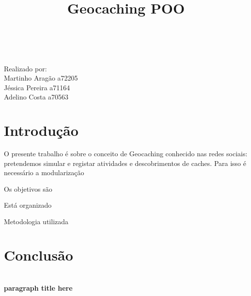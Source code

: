 \documentclass[a4paper,12pt]{article}
\title{Geocaching POO}
\begin{document}
\maketitle
\\
\\Realizado por:
\\Martinho Aragão a72205 
\\Jéssica Pereira a71164	
\\Adelino Costa a70563
\\


\tableofcontents

\section{Introdução}
O presente trabalho é sobre o conceito de Geocaching conhecido nas redes sociais: pretendemos simular e registar atividades e descobrimentos de caches. Para isso é necessário a modularização 

Os objetivos são

Está organizado 

Metodologia utilizada

\section{Conclusão}


\section{}
\subsection{}
\subsubsection{}

\paragraph{paragraph title here}
\end{document}
